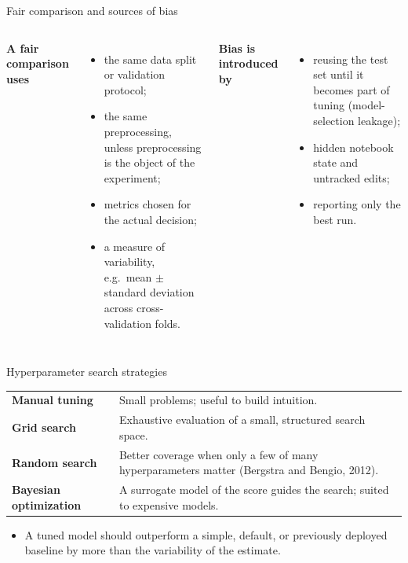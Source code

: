 \begin{frame}{Fair comparison and sources of bias}
\begin{columns}[T]
\textbf{A fair comparison uses}
\begin{itemize}
\item the same data split or validation protocol;
\item the same preprocessing, unless preprocessing is the object of the experiment;
\item metrics chosen for the actual decision;
\item a measure of variability, e.g.\ mean $\pm$ standard deviation across cross-validation folds.
\end{itemize}
\textbf{Bias is introduced by}
\begin{itemize}
\item reusing the test set until it becomes part of tuning (model-selection leakage);
\item hidden notebook state and untracked edits;
\item reporting only the best run.
\end{itemize}
\end{columns}
\coursefooter
\end{frame}

\begin{frame}{Hyperparameter search strategies}
\begin{tabularx}{\textwidth}{>{\bfseries}l X}
Manual tuning & Small problems; useful to build intuition. \\
\addlinespace[0.3em]
Grid search & Exhaustive evaluation of a small, structured search space. \\
\addlinespace[0.3em]
Random search & Better coverage when only a few of many hyperparameters matter (Bergstra and Bengio, 2012). \\
\addlinespace[0.3em]
Bayesian optimization & A surrogate model of the score guides the search; suited to expensive models. \\
\bottomrule
\end{tabularx}
\vspace{0.6em}
\begin{itemize}
\item A tuned model should outperform a simple, default, or previously deployed baseline by more than the variability of the estimate.
\end{itemize}
\coursefooter
\end{frame}


